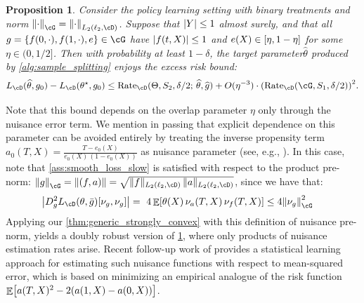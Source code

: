 \documentclass[11pt]{article} %
\newcommand{\journal}[1]{\iftoggle{journal}{#1}{}}
\newcommand{\loose}{\journal{\looseness=-1}}
\newcommand{\pref}[1]{\cref{#1}}
\theoremstyle{theorem}  %
\newtheorem{proposition}{Proposition}
\theoremstyle{plain}
\DeclarePairedDelimiter{\abs}{\lvert}{\rvert} %
\DeclarePairedDelimiter{\brk}{[}{]}
\DeclarePairedDelimiter{\crl}{\{}{\}}
\DeclarePairedDelimiter{\prn}{(}{)}
\DeclarePairedDelimiter{\nrm}{\|}{\|}
\DeclareMathOperator{\En}{\mathbb{E}}
\newcommand{\ls}{\ell}
\newcommand{\wh}[1]{\widehat{#1}}
\newenvironment{revone}{\color{black}}{\ignorespacesafterend}
\newcommand{\bigoh}{O}
\newcommand{\midsem}{;\,}
\newcommand{\poprisk}{L_{\cD}}
\newcommand{\estone}{\wh{g}}
\newcommand{\esttwo}{\wh{\theta}}
\newcommand{\nuisance}{\cG}
\newcommand{\target}{\Theta}
\newcommand{\Rate}{\mathrm{Rate}_{\cD}}
\newcommand{\besttwo}{\theta^{\star}}
\newcommand{\gtone}{g_0}
\newcommand{\sampleone}{S_1}
\newcommand{\sampletwo}{S_2}
\newcommand{\param}{parameter\xspace}
\begin{document}
%
\begin{revone}
  \begin{proposition}
    \label{prop:policy_learning}
    Consider the policy learning setting with binary treatments and norm $\nrm*{\cdot}_{\nuisance}=\nrm*{\cdot}_{L_2(\ls_2,\cD)}$. Suppose that $\abs{Y}\leq{}1$ almost surely, and that all $g=\crl*{f(0,\cdot),f(1,\cdot),e}\in\cG$ have $\abs{f(t,X)}\leq{}1$ and $e(X)\in\brk{\eta,1-\eta}$ for some $\eta\in(0,1/2]$. Then with probability at least $1-\delta$, the target \param $\esttwo$ produced by \pref{alg:sample_splitting} enjoys the excess risk bound:\loose
\[
L_{\cD}(\esttwo,\gtone) - L_{\cD}(\besttwo, \gtone) 
\leq{}  \Rate(\target, \sampletwo, \delta/2\midsem{}\esttwo,\estone) + \bigoh(\eta^{-3}) \cdot
\prn*{\Rate(\nuisance,\sampleone,\delta/2)}^{2}.
\]
\end{proposition}
Note that this bound depends on the overlap parameter $\eta$ only through the nuisance error term. We mention in passing that explicit dependence on this parameter can be avoided entirely by treating the inverse propensity term $a_0(T,X)=\frac{T-e_0(X)}{e_0(X)\, (1-e_0(X))}$ as nuisance parameter (see, e.g., \cite{chernozhukov2021automatic}). In this case, note that \pref{ass:smooth_loss_slow} is satisfied with respect to the product pre-norm: $\nrm*{g}_{\nuisance}=\nrm*{(f,a)}=\sqrt{\|f\|_{L_2(\ell_2,\cD)}\, \|a\|_{L_2(\ell_2,\cD)}}$, since we have that:
\begin{align*}
  \abs*{D^{2}_{g}\poprisk(\theta,\bar{g})[\nu_g, \nu_g]} 
  ={}~& 4\En\brk*{\theta(X)\, \nu_a(T,X)\, \nu_f(T,X) }
  \leq{} 4 \nrm*{\nu_g}_{\nuisance}^2
\end{align*}
Applying our \pref{thm:generic_strongly_convex} with this definition of nuisance pre-norm, yields a doubly robust version of \pref{prop:policy_learning}, where only products of nuisance estimation rates arise. Recent follow-up work of \cite{chernozhukov2021automatic} provides a statistical learning approach for estimating such nuisance functions with respect to mean-squared error, which is based on minimizing an empirical analogue of the risk function $\En\brk*{a(T, X)^2 - 2 (a(1, X) - a(0,X))}$.
\end{revone}
%

%


%
%
%
%
 
\end{document}
